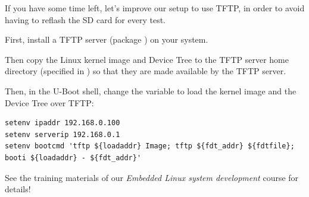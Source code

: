 If you have some time left, let's improve our setup to use TFTP, in
order to avoid having to reflash the SD card for every test.

First, install a TFTP server (package ) on your system.

Then copy the Linux kernel image and Device Tree to the TFTP server home
directory (specified in ) so that they are
made available by the TFTP server.

Then, in the U-Boot shell, change the  variable to load the
kernel image and the Device Tree over TFTP:

\small{
\begin{verbatim}
setenv ipaddr 192.168.0.100
setenv serverip 192.168.0.1
setenv bootcmd 'tftp ${loadaddr} Image; tftp ${fdt_addr} ${fdtfile}; booti ${loadaddr} - ${fdt_addr}'
\end{verbatim}
}

See the training materials of our {\em Embedded Linux system
  development} course for details!
